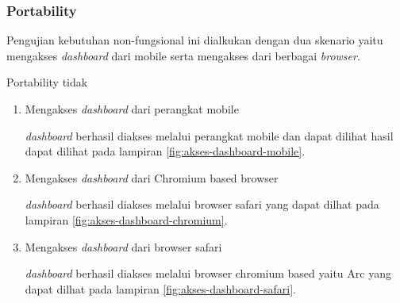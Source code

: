 \subsubsection{Portability}
Pengujian kebutuhan non-fungsional ini dialkukan dengan dua skenario yaitu mengakses \textit{dashboard} dari mobile serta mengakses dari berbagai \textit{browser}.

Portability tidak

\begin{enumerate}
  \item Mengakses \textit{dashboard} dari perangkat mobile

        \textit{dashboard} berhasil diakses melalui perangkat mobile dan dapat dilihat hasil dapat dilihat pada lampiran \ref{fig:akses-dashboard-mobile}.

  \item Mengakses \textit{dashboard} dari Chromium based browser

        \textit{dashboard} berhasil diakses melalui browser safari yang dapat dilhat pada lampiran \ref{fig:akses-dashboard-chromium}.

  \item Mengakses \textit{dashboard} dari browser safari

        \textit{dashboard} berhasil diakses melalui browser chromium based yaitu Arc yang dapat dilhat pada lampiran \ref{fig:akses-dashboard-safari}.

\end{enumerate}